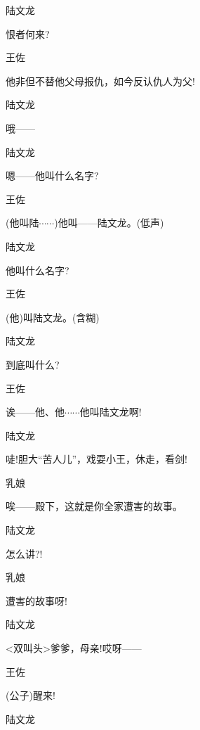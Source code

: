 {{{陆文龙\hspace{20pt}~

恨者何来?}

{王佐\hspace{30pt}~

他非但不替他父母报仇，如今反认仇人为父!}

{陆文龙\hspace{20pt}~

哦------}

{陆文龙\hspace{20pt}~

嗯------他叫什么名字?}

{王佐\hspace{30pt}~

(他叫陆$\cdots{}\cdots{}$)他叫------陆文龙。(低声)}

{陆文龙\hspace{20pt}~

他叫什么名字?}

{王佐\hspace{30pt}~

(他)叫陆文龙。(含糊)}

{陆文龙\hspace{20pt}~

到底叫什么?}

{王佐\hspace{30pt}~

诶------他、他$\cdots{}\cdots{}$他叫陆文龙啊!}

{陆文龙\hspace{20pt}~

唗!胆大``苦人儿''，戏耍小王，休走，看剑!}

{乳娘\hspace{30pt}~

唉------殿下，这就是你全家遭害的故事。}

{陆文龙\hspace{20pt}~

怎么讲?!}

{乳娘\hspace{30pt}~

遭害的故事呀!}

{陆文龙\hspace{20pt}~

\textless{}双叫头\textgreater{}爹爹，母亲!哎呀------}

{王佐\hspace{30pt}~

(公子)醒来!}

{陆文龙\hspace{20pt}~

}}}
